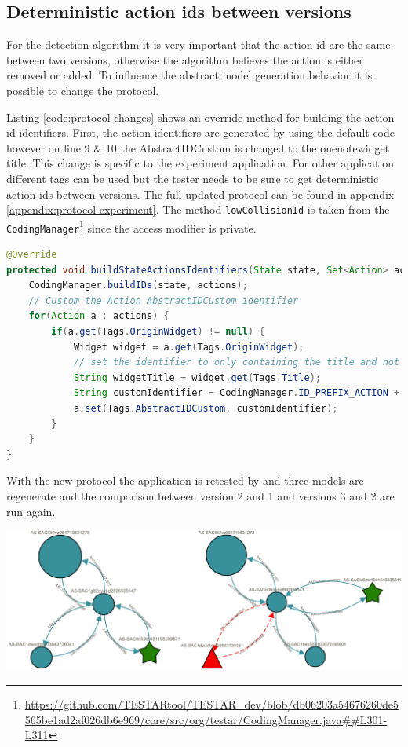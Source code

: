 \subsection{Deterministic action ids between versions}

For the detection algorithm it is very important that the action id are the same between two versions, otherwise the algorithm believes the action is either removed or added. To influence the abstract model generation behavior it is possible to change the \testar protocol. 

Listing \ref{code:protocol-changes} shows an override method for building the action id identifiers. First, the action identifiers are generated by using the default \testar code however on line 9 \& 10 the AbstractIDCustom is changed to the onenotewidget title. This change is specific to the experiment application. For other application different tags can be used but the tester needs to be sure to get deterministic action ids between versions. The full updated protocol can be found in appendix \ref{appendix:protocol-experiment}. The method \verb|lowCollisionId| is taken from the \verb|CodingManager|\footnote{\url{https://github.com/TESTARtool/TESTAR_dev/blob/db06203a54676260de5565be1ad2af026db6e969/core/src/org/testar/CodingManager.java##L301-L311}} since the access modifier is private.

\begin{lstlisting}[language=Java, caption=overwrite buildStateActionsIdentifiers method, label=code:protocol-changes]
@Override
protected void buildStateActionsIdentifiers(State state, Set<Action> actions) {
	CodingManager.buildIDs(state, actions);
	// Custom the Action AbstractIDCustom identifier
	for(Action a : actions) {
		if(a.get(Tags.OriginWidget) != null) {
			Widget widget = a.get(Tags.OriginWidget);
			// set the identifier to only containing the title and not to include the parent
			String widgetTitle = widget.get(Tags.Title);
			String customIdentifier = CodingManager.ID_PREFIX_ACTION + CodingManager.ID_PREFIX_ABSTRACT_CUSTOM + lowCollisionID(widgetTitle);
			a.set(Tags.AbstractIDCustom, customIdentifier);
		}
	}
}
\end{lstlisting}

With the new protocol the application is retested by \testar and three models are regenerate and the comparison between version 2 and 1 and versions 3 and 2 are run again. 

\begingroup
\captionsetup{type=figure}
\includegraphics[scale=0.2]{images/6-Correct-Merge.png}
\label{fig:correct-merge-outcome}
\endgroup

